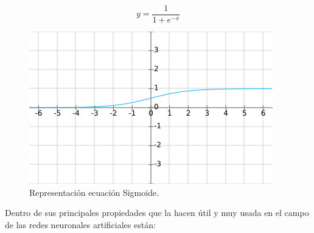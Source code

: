             \begin{equation}
                \label{EQ:Sigmoid}
                y = \frac{1}{1+e^{-x}}
            \end{equation}
            
            \begin{figure}[ht!]
            	\centering
            	\includegraphics[width=0.6\linewidth]{imgs/02-Referential/02-Sigmoid.png}
            	\caption[Representación ecuación Sigmoide]{Representación ecuación Sigmoide.}
        	    \label{fig:Sigmoid}
            \end{figure}%
            
            Dentro de sus principales propiedades que la hacen útil y muy usada en el campo de las redes neuronales artificiales están:
            
